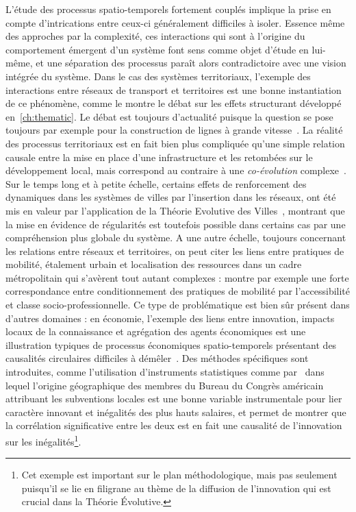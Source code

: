 {
L'étude des processus spatio-temporels fortement couplés implique la prise en compte d'intrications entre ceux-ci généralement difficiles à isoler. Essence même des approches par la complexité, ces interactions qui sont à l'origine du comportement émergent d'un système font sens comme objet d'étude en lui-même, et une séparation des processus paraît alors contradictoire avec une vision intégrée du système. Dans le cas des systèmes territoriaux, l'exemple des interactions entre réseaux de transport et territoires est une bonne instantiation de ce phénomène, comme le montre le débat sur les effets structurant développé en~\ref{ch:thematic}. Le débat est toujours d'actualité puisque la question se pose toujours par exemple pour la construction de lignes à grande vitesse~\cite{crozethalshs01094554}. La réalité des processus territoriaux est en fait bien plus compliquée qu'une simple relation causale entre la mise en place d'une infrastructure et les retombées sur le développement local, mais correspond au contraire à une \emph{co-évolution} complexe~\cite{bretagnolletel00459720}. Sur le temps long et à petite échelle, certains effets de renforcement des dynamiques dans les systèmes de villes par l'insertion dans les réseaux, ont été mis en valeur par l'application de la Théorie Evolutive des Villes~\cite{espacegeo2014effets}, montrant que la mise en évidence de régularités est toutefois possible dans certains cas par une compréhension plus globale du système. A une autre échelle, toujours concernant les relations entre réseaux et territoires, on peut citer les liens entre pratiques de mobilité, étalement urbain et localisation des ressources dans un cadre métropolitain qui s'avèrent tout autant complexes : \cite{cerqueira2017inegalites} montre par exemple une forte correspondance entre conditionnement des pratiques de mobilité par l'accessibilité et classe socio-professionnelle. Ce type de problématique est bien sûr présent dans d'autres domaines : en économie, l'exemple des liens entre innovation, impacts locaux de la connaissance et agrégation des agents économiques est une illustration typiques de processus économiques spatio-temporels présentant des causalités circulaires difficiles à démêler~\cite{audretsch1996r}. Des méthodes spécifiques sont introduites, comme l'utilisation d'instruments statistiques comme par~\cite{aghion2015innovation} dans lequel l'origine géographique des membres du Bureau du Congrès américain attribuant les subventions locales est une bonne variable instrumentale pour lier caractère innovant et inégalités des plus hauts salaires, et permet de montrer que la corrélation significative entre les deux est en fait une causalité de l'innovation sur les inégalités\footnote{Cet exemple est important sur le plan méthodologique, mais pas seulement puisqu'il se lie en filigrane au thème de la diffusion de l'innovation qui est crucial dans la Théorie Évolutive.}.
}



